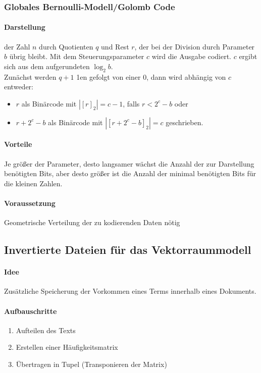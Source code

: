 \documentclass{article}
\begin{document}
\subsubsection{Globales Bernoulli-Modell/Golomb Code}
\paragraph{Darstellung} der Zahl $n$ durch Quotienten $q$ und Rest $r$, der bei der Division durch Parameter $b$ übrig bleibt. Mit dem Steuerungsparameter $c$ wird die Ausgabe codiert. $c$ ergibt sich aus dem aufgerundeten $\log_{2}b$. \\
Zunächst werden $q+1$ 1en gefolgt von einer 0, dann wird abhängig von $c$ entweder:
\begin{itemize}
\item $r$ als Binärcode mit $|[r]_{2}| = c-1$, falls $r < 2^{c} - b$ oder
\item $r +  2^{c} - b$ als Binärcode mit $|[r +  2^{c} - b]_{2}| = c$ geschrieben.
\end{itemize}
\paragraph{Vorteile} Je größer der Parameter, desto langsamer wächst die Anzahl der zur Darstellung benötigten Bits, aber desto größer ist die Anzahl der minimal benötigten Bits für die kleinen Zahlen. 
\paragraph{Voraussetzung} Geometrische Verteilung der zu kodierenden Daten nötig

\subsection{Invertierte Dateien für das Vektorraummodell}
\paragraph{Idee} Zusätzliche Speicherung der Vorkommen eines Terms innerhalb eines Dokuments.
\paragraph{Aufbauschritte}
\begin{enumerate}
\item Aufteilen des Texts
\item Erstellen einer Häufigkeitsmatrix
\item Übertragen in Tupel (Transponieren der Matrix)
\end{enumerate}
\end{document}
